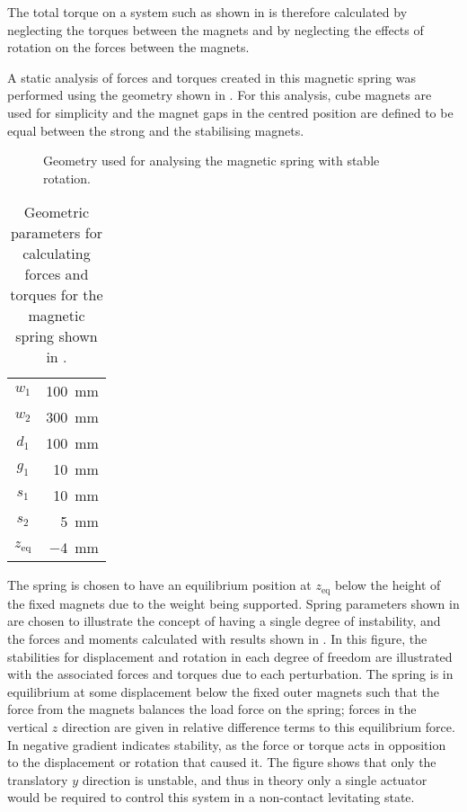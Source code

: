 The total torque on a system such as shown in  is therefore calculated by neglecting the torques between the magnets and by neglecting the effects of rotation on the forces between the magnets.

A static analysis of forces and torques created in this magnetic spring was performed using the geometry shown in . For this analysis, cube magnets are used for simplicity and the magnet gaps in the centred position are defined to be equal between the strong and the stabilising magnets.

\begin{figure}
  \caption{Geometry used for analysing the magnetic spring with stable rotation.}
\end{figure}

\begin{table}
  \caption{Geometric parameters for calculating forces and torques for the magnetic spring shown in .}
  \begin{tabular}{cr}
    \toprule
      $w_1$ &  \SI{100}{mm}  \\
      $w_2$ &  \SI{300}{mm}  \\
      $d_1$ &  \SI{100}{mm}  \\
      $g_1$ &  \SI {10}{mm}  \\
      $s_1$ &  \SI {10}{mm}  \\
      $s_2$ &  \SI  {5}{mm}  \\
    \midrule
      $z_{\text{eq}}$ & \SI{-4}{mm} \\
    \bottomrule
  \end{tabular}
\end{table}

The spring is chosen to have an equilibrium position at $z_{\text{eq}}$ below
the height of the fixed magnets due to the weight being supported.
Spring parameters shown in  are chosen to illustrate the concept of having a single degree of instability, and the forces and moments calculated with results shown in .
In this figure, the stabilities for displacement and rotation in each degree of freedom are illustrated with the associated forces and torques due to each perturbation.
The spring is in equilibrium at some displacement below the fixed outer magnets such that the force from the magnets balances the load force on the spring; forces in the vertical $z$ direction are given in relative difference terms to this equilibrium force.
In  negative gradient indicates stability, as the force or torque acts in opposition to the displacement or rotation that caused it.
The figure shows that only the translatory $y$ direction is unstable, and thus in theory only a single actuator would be required to control this system in a non-contact levitating state.

